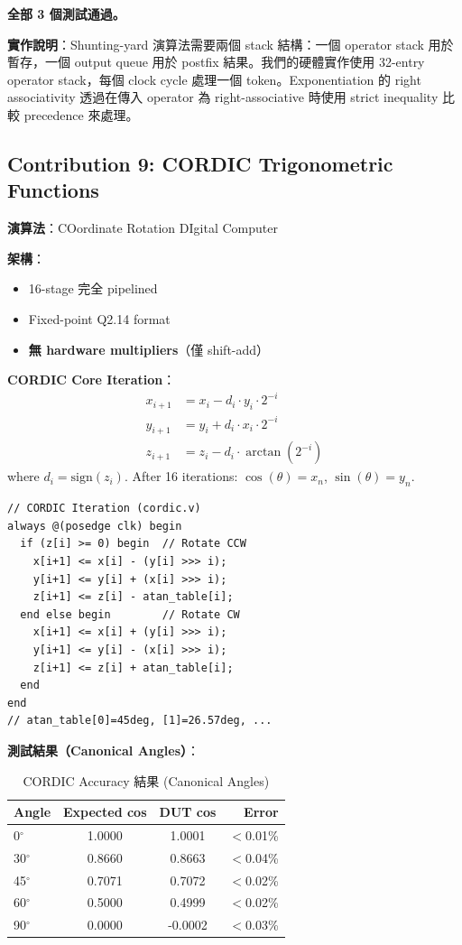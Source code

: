 \documentclass[journal]{IEEEtran}
\begin{document}
\textbf{全部 3 個測試通過。}

\textbf{實作說明}：Shunting-yard 演算法需要兩個 stack 結構：一個 operator stack 用於暫存，一個 output queue 用於 postfix 結果。我們的硬體實作使用 32-entry operator stack，每個 clock cycle 處理一個 token。Exponentiation 的 right associativity 透過在傳入 operator 為 right-associative 時使用 strict inequality 比較 precedence 來處理。

\subsection{Contribution 9: CORDIC Trigonometric Functions}

\textbf{演算法}：COordinate Rotation DIgital Computer~\cite{volder1959cordic}

\textbf{架構}：
\begin{itemize}
    \item 16-stage 完全 pipelined
    \item Fixed-point Q2.14 format
    \item \textbf{無 hardware multipliers}（僅 shift-add）
\end{itemize}

\textbf{CORDIC Core Iteration}：
\begin{align}
x_{i+1} &= x_i - d_i \cdot y_i \cdot 2^{-i} \\
y_{i+1} &= y_i + d_i \cdot x_i \cdot 2^{-i} \\
z_{i+1} &= z_i - d_i \cdot \arctan(2^{-i})
\end{align}
where $d_i = \text{sign}(z_i)$. After 16 iterations: $\cos(\theta) = x_n$, $\sin(\theta) = y_n$.

\begin{lstlisting}
// CORDIC Iteration (cordic.v)
always @(posedge clk) begin
  if (z[i] >= 0) begin  // Rotate CCW
    x[i+1] <= x[i] - (y[i] >>> i);
    y[i+1] <= y[i] + (x[i] >>> i);
    z[i+1] <= z[i] - atan_table[i];
  end else begin        // Rotate CW
    x[i+1] <= x[i] + (y[i] >>> i);
    y[i+1] <= y[i] - (x[i] >>> i);
    z[i+1] <= z[i] + atan_table[i];
  end
end
// atan_table[0]=45deg, [1]=26.57deg, ...
\end{lstlisting}

\textbf{測試結果（Canonical Angles）}：
\begin{table}[htbp]
\centering
\caption{CORDIC Accuracy 結果 (Canonical Angles)}
\footnotesize
\begin{tabular}{@{}lccr@{}}
\toprule
\textbf{Angle} & \textbf{Expected cos} & \textbf{DUT cos} & \textbf{Error} \\
\midrule
0$^\circ$ & 1.0000 & 1.0001 & $<$0.01\% \\
30$^\circ$ & 0.8660 & 0.8663 & $<$0.04\% \\
45$^\circ$ & 0.7071 & 0.7072 & $<$0.02\% \\
60$^\circ$ & 0.5000 & 0.4999 & $<$0.02\% \\
90$^\circ$ & 0.0000 & -0.0002 & $<$0.03\% \\
\bottomrule
\end{tabular}
\end{table}
\end{document}
